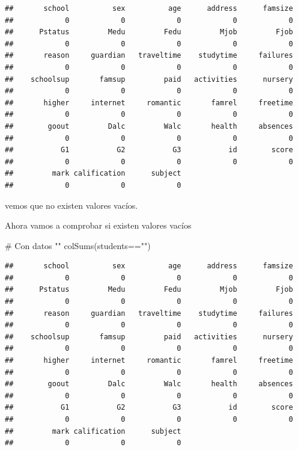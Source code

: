 \documentclass[]{article}
\newenvironment{Shaded}{\begin{snugshade}}{\end{snugshade}}
\newcommand{\CommentTok}[1]{\textcolor[rgb]{0.50,0.62,0.50}{#1}}
\newcommand{\KeywordTok}[1]{\textcolor[rgb]{0.94,0.87,0.69}{#1}}
\newcommand{\NormalTok}[1]{\textcolor[rgb]{0.80,0.80,0.80}{#1}}
\newcommand{\OperatorTok}[1]{\textcolor[rgb]{0.94,0.94,0.82}{#1}}
\newcommand{\StringTok}[1]{\textcolor[rgb]{0.80,0.58,0.58}{#1}}
\begin{document}
\begin{verbatim}
##       school          sex          age      address      famsize 
##            0            0            0            0            0 
##      Pstatus         Medu         Fedu         Mjob         Fjob 
##            0            0            0            0            0 
##       reason     guardian   traveltime    studytime     failures 
##            0            0            0            0            0 
##    schoolsup       famsup         paid   activities      nursery 
##            0            0            0            0            0 
##       higher     internet     romantic       famrel     freetime 
##            0            0            0            0            0 
##        goout         Dalc         Walc       health     absences 
##            0            0            0            0            0 
##           G1           G2           G3           id        score 
##            0            0            0            0            0 
##         mark calification      subject 
##            0            0            0
\end{verbatim}

vemos que no existen valores vacíos.

Ahora vamos a comprobar si existen valores vacíos

\begin{Shaded}
\begin{Highlighting}[]
\CommentTok{# Con datos ""}
\KeywordTok{colSums}\NormalTok{(students}\OperatorTok{==}\StringTok{""}\NormalTok{)}
\end{Highlighting}
\end{Shaded}

\begin{verbatim}
##       school          sex          age      address      famsize 
##            0            0            0            0            0 
##      Pstatus         Medu         Fedu         Mjob         Fjob 
##            0            0            0            0            0 
##       reason     guardian   traveltime    studytime     failures 
##            0            0            0            0            0 
##    schoolsup       famsup         paid   activities      nursery 
##            0            0            0            0            0 
##       higher     internet     romantic       famrel     freetime 
##            0            0            0            0            0 
##        goout         Dalc         Walc       health     absences 
##            0            0            0            0            0 
##           G1           G2           G3           id        score 
##            0            0            0            0            0 
##         mark calification      subject 
##            0            0            0
\end{verbatim}
\end{document}
